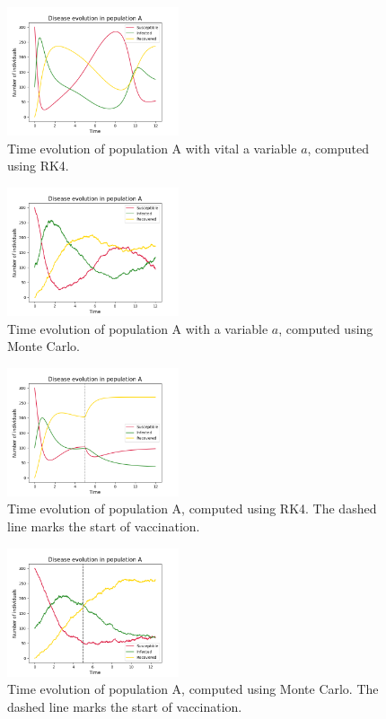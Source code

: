 \documentclass[notitlepage, reprint, nofootinbib]{revtex4-1}
\begin{document}
\begin{figure}
	\centering
	\includegraphics[width=0.45\textwidth]{../Figures/RK4_popA_sv}
	\caption{Time evolution of population A with vital a variable $a$, computed using RK4.}
	\label{RK4_sv}
\end{figure}
\begin{figure}
	\centering
	\includegraphics[width=0.45\textwidth]{../Figures/MC_popA_sv}
	\caption{Time evolution of population A with a variable $a$, computed using Monte Carlo.}
	\label{MC_sv}
\end{figure}
\begin{figure}
	\centering
	\includegraphics[width=0.45\textwidth]{../Figures/RK4_popA_vacc}
	\caption{Time evolution of population A, computed using RK4. The dashed line marks the start of vaccination.}
	\label{RK4_vacc}
\end{figure}
\begin{figure}
	\centering
	\includegraphics[width=0.45\textwidth]{../Figures/MC_popA_vacc}
	\caption{Time evolution of population A, computed using Monte Carlo. The dashed line marks the start of vaccination.}
	\label{MC_vacc}
\end{figure}
\end{document}
